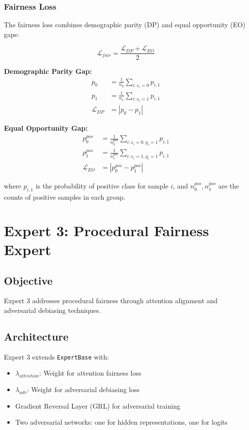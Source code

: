 \documentclass[11pt]{article}
\begin{document}
\subsubsection{Fairness Loss}
The fairness loss combines demographic parity (DP) and equal opportunity (EO) gaps:

\begin{equation}
    \mathcal{L}_{fair} = \frac{\mathcal{L}_{DP} + \mathcal{L}_{EO}}{2}
\end{equation}

\textbf{Demographic Parity Gap:}
\begin{align}
    p_0 &= \frac{1}{n_0} \sum_{i: s_i = 0} p_{i,1} \\
    p_1 &= \frac{1}{n_1} \sum_{i: s_i = 1} p_{i,1} \\
    \mathcal{L}_{DP} &= |p_0 - p_1|
\end{align}

\textbf{Equal Opportunity Gap:}
\begin{align}
    p_0^{pos} &= \frac{1}{n_0^{pos}} \sum_{i: s_i = 0, y_i = 1} p_{i,1} \\
    p_1^{pos} &= \frac{1}{n_1^{pos}} \sum_{i: s_i = 1, y_i = 1} p_{i,1} \\
    \mathcal{L}_{EO} &= |p_0^{pos} - p_1^{pos}|
\end{align}

where $p_{i,1}$ is the probability of positive class for sample $i$, and $n_0^{pos}, n_1^{pos}$ are the counts of positive samples in each group.

\section{Expert 3: Procedural Fairness Expert}

\subsection{Objective}
Expert 3 addresses procedural fairness through attention alignment and adversarial debiasing techniques.

\subsection{Architecture}
Expert 3 extends \texttt{ExpertBase} with:
\begin{itemize}
    \item $\lambda_{attention}$: Weight for attention fairness loss
    \item $\lambda_{adv}$: Weight for adversarial debiasing loss
    \item Gradient Reversal Layer (GRL) for adversarial training
    \item Two adversarial networks: one for hidden representations, one for logits
\end{itemize}
\end{document}
